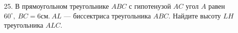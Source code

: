 25. В прямоугольном треугольнике $ABC$ с гипотенузой $AC$ угол $A$ равен $60^\circ,\ BC=6\text{см}.\ AL$ --- биссектриса треугольника $ABC.$ Найдите высоту $LH$ треугольника $ALC.$\\
